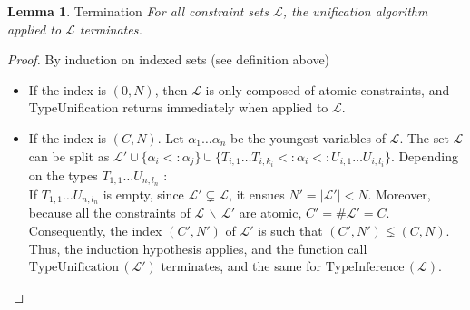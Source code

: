 \documentclass[9pt]{article}
\theoremstyle{plain}
\theoremstyle{definition}
\newtheorem{lemma}{Lemma}[section]
\begin{document}
\begin{lemma}{Termination}
	\textit{For all constraint sets $\mathcal{L}$, the unification algorithm applied to $\mathcal{L}$ terminates. }
	\begin{proof}
		By induction on indexed sets (see definition above)
		\begin{itemize}
			\item If the index is $(0, N)$, then $\mathcal{L}$ is only composed of atomic constraints, and TypeUnification returns
				immediately when applied to $\mathcal{L}$.
				
			\item If the index is $(C, N)$.
				Let $\alpha_1 \dots \alpha_n$ be the youngest variables of $\mathcal{L}$. The set $\mathcal{L}$ can
				be split as $\mathcal{L'} \cup \{\alpha_i <: \alpha_j \} \cup \{ T_{i, 1} \dots T_{i, k_i} <: \alpha_i <: U_{i, 1} \dots U_{i, l_i} \}$.
				Depending on the types $T_{1, 1} \dots U_{n, l_n}$ : \\

				If $T_{1, 1} \dots U_{n, l_n}$ is empty, since $\mathcal{L'} \subsetneq \mathcal{L}$, it ensues $N' = |\mathcal{L'}| < N$.
				Moreover, because all the constraints of $\mathcal{L} \,\backslash\, \mathcal{L'}$ are atomic, $C' = \#\mathcal{L'} = C$.
				Consequently, the index $(C', N')$ of $\mathcal{L'}$ is such that $(C', N') \lneq (C, N)$.
				Thus, the induction hypothesis applies, and the function call $\text{TypeUnification}\,(\mathcal{L'})$ terminates, and the same
				for $\text{TypeInference}\,(\mathcal{L})$. \\
							

\end{itemize}
\end{proof}
\end{lemma}
\end{document}
